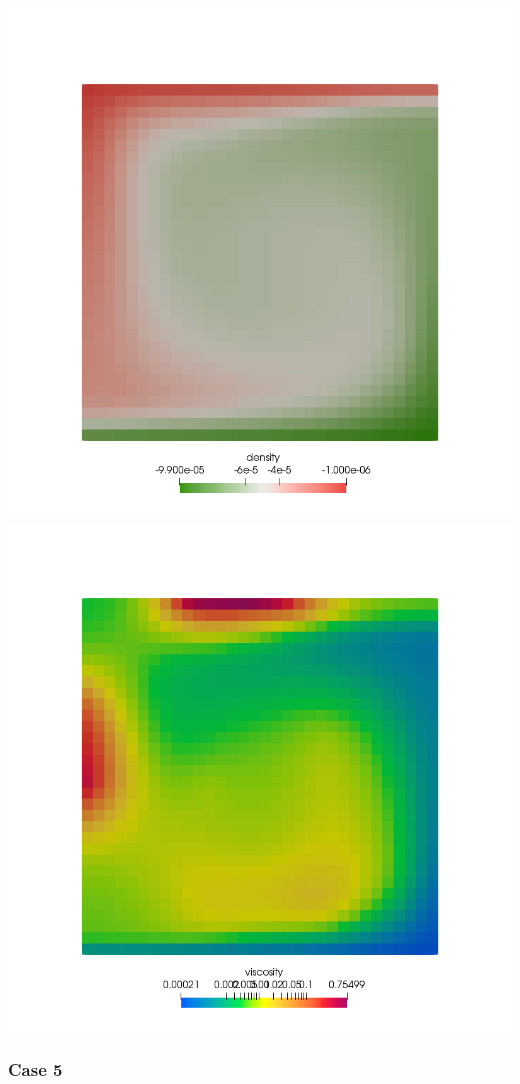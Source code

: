 \begin{center}
\includegraphics[width=7.cm]{python_codes/fieldstone_28/results_case4/rho}
\includegraphics[width=7.cm]{python_codes/fieldstone_28/results_case4/mueff}
\end{center}

\newpage %
\subsubsection{Case 5}

